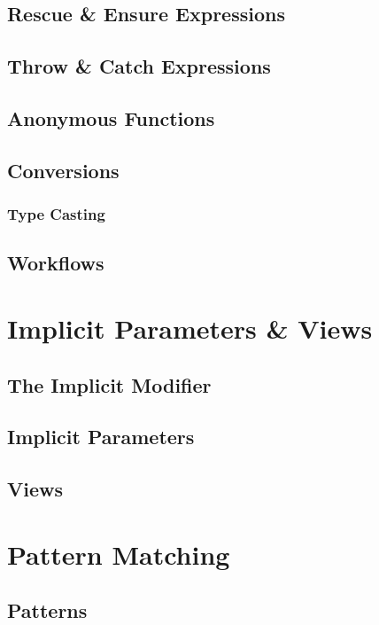 \section{Rescue \& Ensure Expressions}

\section{Throw \& Catch Expressions}

\section{Anonymous Functions}

\section{Conversions}

\subsection{Type Casting}

\section{Workflows}
\label{sec:workflows}

\chapter{Implicit Parameters \& Views}

\section{The Implicit Modifier}

\section{Implicit Parameters}
\label{sec:implicit-parameters}

\section{Views}

\chapter{Pattern Matching}

\section{Patterns}
\label{sec:patterns}

